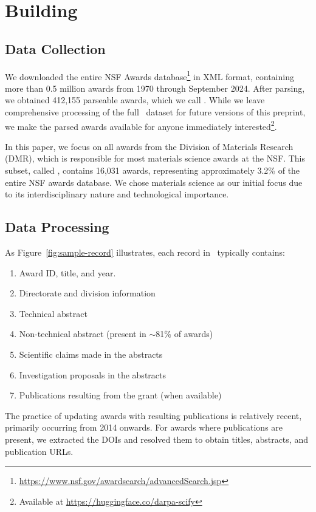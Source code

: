 \documentclass[11pt]{article}
\begin{document}
\section{Building \DatasetName}

\subsection{Data Collection}
We downloaded the entire NSF Awards database\footnote{\url{https://www.nsf.gov/awardsearch/advancedSearch.jsp}} in XML format, containing more than 0.5 million awards from 1970 through September 2024. After parsing, we obtained 412,155 parseable awards, which we call \DatasetName. While we leave comprehensive processing of the full \DatasetName~dataset for future versions of this preprint, we make the parsed awards available for anyone immediately interested\footnote{Available at \url{https://huggingface.co/darpa-scify}}.

In this paper, we focus on all awards from the Division of Materials Research (DMR), which is responsible for most materials science awards at the NSF.  This subset, called \DatasetNameMatSci, contains 16,031 awards, representing approximately 3.2\% of the entire NSF awards database. We chose materials science as our initial focus due to its interdisciplinary nature and technological importance.

\subsection{Data Processing}

As Figure~\ref{fig:sample-record} illustrates, each record in  \DatasetNameMatSci~typically contains:
\begin{enumerate}[noitemsep,topsep=0pt]
\item Award ID, title, and year.
\item Directorate and division information
\item Technical abstract
\item Non-technical abstract (present in $\sim$81\% of awards)
\item Scientific claims made in the abstracts
\item Investigation proposals in the abstracts
\item Publications resulting from the grant (when available)
\end{enumerate}

The practice of updating awards with resulting publications is relatively recent, primarily occurring from 2014 onwards. For awards where publications are present, we extracted the DOIs and resolved them to obtain titles, abstracts, and publication URLs.
\end{document}
